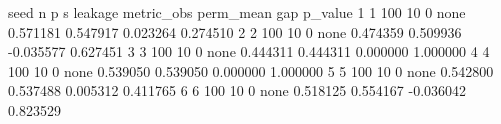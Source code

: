 \begin{CodeOutput}
  seed   n  p s leakage metric_obs perm_mean       gap  p_value
1    1 100 10 0    none   0.571181  0.547917  0.023264 0.274510
2    2 100 10 0    none   0.474359  0.509936 -0.035577 0.627451
3    3 100 10 0    none   0.444311  0.444311  0.000000 1.000000
4    4 100 10 0    none   0.539050  0.539050  0.000000 1.000000
5    5 100 10 0    none   0.542800  0.537488  0.005312 0.411765
6    6 100 10 0    none   0.518125  0.554167 -0.036042 0.823529
\end{CodeOutput}
